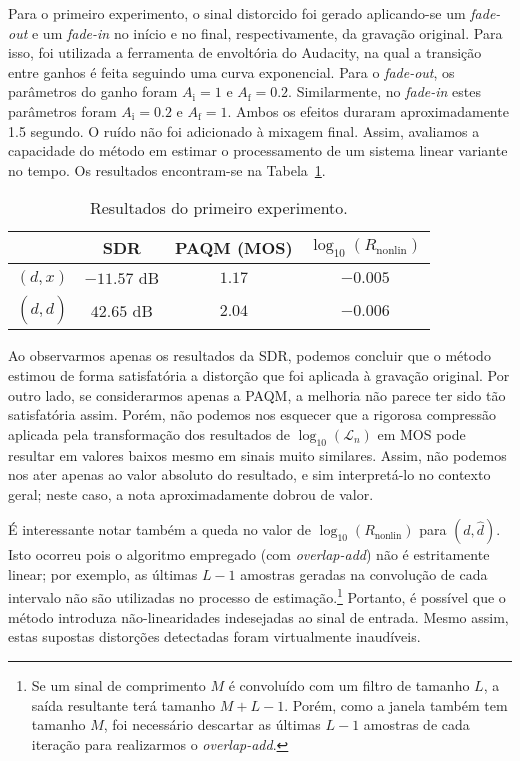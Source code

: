 Para o primeiro experimento, o sinal distorcido foi gerado aplicando-se um
\textit{fade-out} e um \textit{fade-in} no início e no final, respectivamente, da
gravação original. Para isso, foi utilizada a ferramenta de envoltória do Audacity, na
qual a transição entre ganhos é feita seguindo uma curva exponencial. Para o
\textit{fade-out}, os parâmetros do ganho foram $A_\mathrm{i} = 1$ e $A_\mathrm{f} =
	0.2$. Similarmente, no \textit{fade-in} estes parâmetros foram $A_\mathrm{i} = 0.2$ e
$A_\mathrm{f} = 1$. Ambos os efeitos duraram aproximadamente 1.5 segundo. O ruído não
foi adicionado à mixagem final. Assim, avaliamos a capacidade do método em estimar o
processamento de um sistema linear variante no tempo. Os resultados encontram-se na
Tabela~\ref{tab:wf:experiment-1}. {\def\arraystretch{1.25}\tabcolsep=10pt
\begin{table}[!ht]
	\centering
	\caption[Resultados do primeiro experimento: \textit{fades}]{Resultados do primeiro experimento.}
	\label{tab:wf:experiment-1}
	\begin{tabular}{cccc}
		\toprule
		               & SDR         & PAQM (MOS) & $\log_{10}(R_{\text{nonlin}})$ \\
		\midrule
		$(d, x)$       & $-11.57$ dB & $1.17$     & $-0.005$                       \\
		$(d, \hat{d})$ & $42.65$ dB  & $2.04$     & $-0.006$                       \\ \bottomrule
	\end{tabular}
\end{table}
}

Ao observarmos apenas os resultados da SDR, podemos concluir que o método estimou de
forma satisfatória a distorção que foi aplicada à gravação original. Por outro lado, se
considerarmos apenas a PAQM, a melhoria não parece ter sido tão satisfatória assim.
Porém, não podemos nos esquecer que a rigorosa compressão aplicada pela transformação
dos resultados de $\log_{10}(\mathcal{L}_n)$ em MOS pode resultar em valores baixos
mesmo em sinais muito similares. Assim, não podemos nos ater apenas ao valor absoluto
do resultado, e sim interpretá-lo no contexto geral; neste caso, a nota aproximadamente
dobrou de valor.

É interessante notar também a queda no valor de $\log_{10} (R_{\text{nonlin}})$ para $(d, \hat{d})$. Isto ocorreu pois o algoritmo empregado (com \textit{overlap-add}) não é estritamente linear; por exemplo, as últimas $L - 1$ amostras geradas na convolução de cada intervalo não são utilizadas no processo de estimação.\footnote{Se um sinal de comprimento $M$ é convoluído com um filtro de tamanho $L$, a saída resultante terá tamanho $M+L-1$. Porém, como a janela também tem tamanho $M$, foi necessário descartar as últimas $L-1$ amostras de cada iteração para realizarmos o \textit{overlap-add}.} Portanto, é possível que o método introduza não-linearidades indesejadas ao sinal de entrada. Mesmo assim, estas supostas distorções detectadas foram virtualmente inaudíveis.

